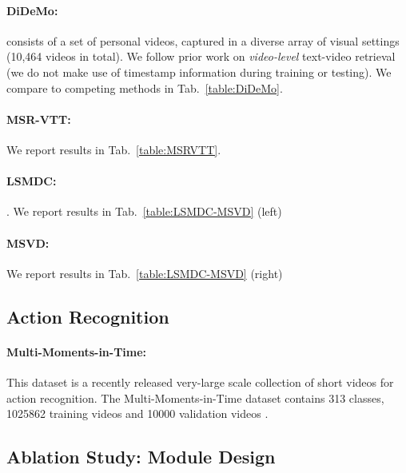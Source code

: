 

\paragraph{DiDeMo:} \cite{anne2017localizing} consists of a set of personal videos, captured in a diverse array of visual settings (10,464 videos in total).  We follow prior work on \textit{video-level} text-video retrieval (we do not make use of timestamp information during training or testing).  We compare to competing methods in Tab.~\ref{table:DiDeMo}.  




\paragraph{MSR-VTT:} \cite{xu2016msr} We report results in Tab.~\ref{table:MSRVTT}. 



\paragraph{LSMDC:} \cite{rohrbach2015dataset}.  We report results in Tab.~\ref{table:LSMDC-MSVD} (left)



\paragraph{MSVD:} \cite{chen2011collecting}  We report results in Tab.~\ref{table:LSMDC-MSVD} (right)

\subsection{Action Recognition}

\paragraph{Multi-Moments-in-Time:} This dataset is a recently released very-large scale collection of short videos for action recognition.  The Multi-Moments-in-Time dataset contains 313 classes, 1025862 training videos and 10000 validation videos \cite{monfortmoments}.

\subsection{Ablation Study: Module Design}

